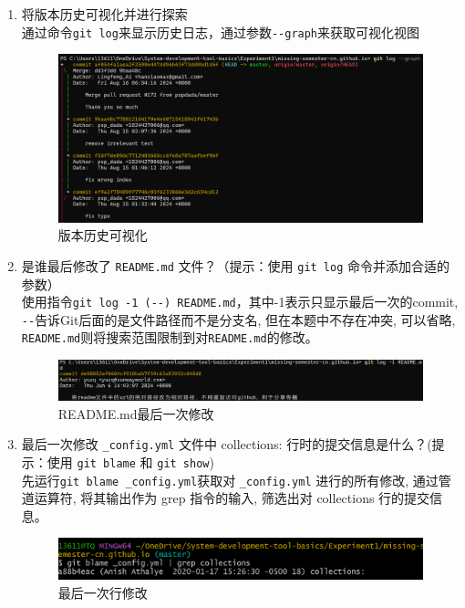 \documentclass{article}
\begin{document}
            \begin{enumerate} 
                \item 将版本历史可视化并进行探索\\
                通过命令\verb|git log|来显示历史日志，通过参数\verb|--graph|来获取可视化视图
                \begin{figure}[H]
                    \centering
                    \includegraphics[scale=0.4]{1.png}
                    \caption{版本历史可视化}
                \end{figure}
                \item 是谁最后修改了 \verb|README.md| 文件？（提示：使用 \verb|git log| 命令并添加合适的参数）\\
                使用指令\verb|git log -1 (--) README.md|，其中-1表示只显示最后一次的commit, 
                \verb|--|告诉Git后面的是文件路径而不是分支名, 但在本题中不存在冲突, 可以省略, 
                \verb|README.md|则将搜索范围限制到对\verb|README.md|的修改。
                \begin{figure}[H]
                    \centering
                    \includegraphics[scale=0.35]{2.png}
                    \caption{README.md最后一次修改}
                \end{figure}
                \item 最后一次修改 \verb|_config.yml| 文件中 collections: 行时的提交信息是什么？(提示：使用 \verb|git blame| 和 \verb|git show|)\\
                先运行\verb |git blame _config.yml|获取对 \verb|_config.yml| 进行的所有修改, 
                通过管道运算符, 将其输出作为 grep 指令的输入, 筛选出对 collections 行的提交信息。
                \begin{figure}[H]
                    \centering
                    \includegraphics[scale=0.7]{3.png}
                    \caption{最后一次行修改}
                \end{figure}
            \end{enumerate}
\end{document}
